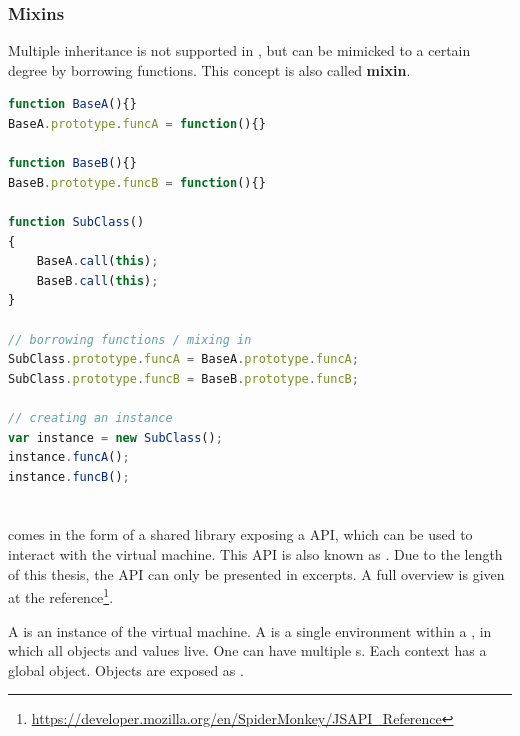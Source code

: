 \subsubsection{Mixins}
\label{sec:Mixins}

Multiple inheritance is not supported in , but can be mimicked to a certain degree by borrowing functions. This concept is also called \textbf{mixin}.

\SingleSpacing
\begin{lstlisting}[language=JavaScript, caption=Mixins in \myProperName{JavaScript}, label=JSMixins]
function BaseA(){}
BaseA.prototype.funcA = function(){}

function BaseB(){}
BaseB.prototype.funcB = function(){}

function SubClass()
{
	BaseA.call(this);
	BaseB.call(this);
}

// borrowing functions / mixing in
SubClass.prototype.funcA = BaseA.prototype.funcA;
SubClass.prototype.funcB = BaseB.prototype.funcB;

// creating an instance
var instance = new SubClass();
instance.funcA();
instance.funcB();
\end{lstlisting}
\OnehalfSpacing

\section{}

 comes in the form of a shared library exposing a  API, which can be used to interact with the  virtual machine. This API is also known as . Due to the length of this thesis, the API can only be presented in excerpts. A full overview is given at the  reference\footnote{\url{https://developer.mozilla.org/en/SpiderMonkey/JSAPI_Reference}}.

A  is an instance of the virtual machine. A  is a single environment within a , in which all objects and values live. One  can have multiple s. Each context has a global object. Objects are exposed as .

